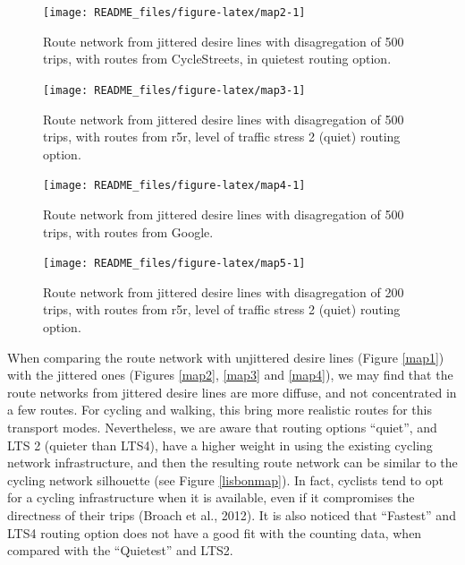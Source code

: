 \documentclass{isprs} %
\begin{document}
\begin{figure}

{\centering \texttt{[image: README\_files/figure-latex/map2-1]} 

}

\caption{\label{map2}Route network from jittered desire lines with disagregation of 500 trips, with routes from CycleStreets, in quietest routing option.}\label{fig:map2}
\end{figure}

\begin{figure}

{\centering \texttt{[image: README\_files/figure-latex/map3-1]} 

}

\caption{\label{map3}Route network from jittered desire lines with disagregation of 500 trips, with routes from r5r, level of traffic stress 2 (quiet) routing option.}\label{fig:map3}
\end{figure}

\begin{figure}

{\centering \texttt{[image: README\_files/figure-latex/map4-1]} 

}

\caption{\label{map4}Route network from jittered desire lines with disagregation of 500 trips, with routes from Google.}\label{fig:map4}
\end{figure}

\begin{figure}

{\centering \texttt{[image: README\_files/figure-latex/map5-1]} 

}

\caption{\label{map5}Route network from jittered desire lines with disagregation of 200 trips, with routes from r5r, level of traffic stress 2 (quiet) routing option.}\label{fig:map5}
\end{figure}

When comparing the route network with unjittered desire lines (Figure \ref{map1}) with the jittered ones (Figures \ref{map2}, \ref{map3} and \ref{map4}), we may find that the route networks from jittered desire lines are more diffuse, and not concentrated in a few routes. For cycling and walking, this bring more realistic routes for this transport modes. Nevertheless, we are aware that routing options ``quiet'', and LTS 2 (quieter than LTS4), have a higher weight in using the existing cycling network infrastructure, and then the resulting route network can be similar to the cycling network silhouette (see Figure \ref{lisbonmap}). In fact, cyclists tend to opt for a cycling infrastructure when it is available, even if it compromises the directness of their trips (Broach et al., 2012).
It is also noticed that ``Fastest'' and LTS4 routing option does not have a good fit with the counting data, when compared with the ``Quietest'' and LTS2.
\end{document}
